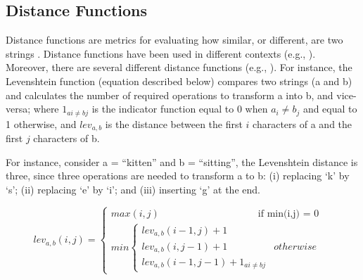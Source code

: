\subsection{Distance Functions}

Distance functions are metrics for evaluating how similar, or different, are two strings \cite{coutinho2016analysis}. Distance functions have been used in different contexts (e.g., \cite{runkler2000automatic,okuda1976method,lubis2018combination}). Moreover, there are several different distance functions (e.g., \cite{hamming1950error,han2007efficient:LCS,huang2008similaritycosine,de1mahalanobis:jaro,Levenshtein_SPD66}). For instance, the Levenshtein function \cite{Levenshtein_SPD66,kruskal1983overview} (equation described below) compares two strings (a and b) and calculates the number of required operations to transform a into b, and vice-versa; where $1_{ai \neq bj}$ is the indicator function equal to 0 when $a_{i} \neq b_{j}$ and equal to 1 otherwise, and $lev_{a,b}$ is the distance between the first $i$ characters of a and the first $j$ characters of b.

For instance, consider a = ``kitten'' and b = ``sitting'', the Levenshtein distance is three, since three operations are needed to transform a to b: (i) replacing `k' by `s'; (ii) replacing `e' by `i'; and (iii) inserting `g' at the end. 


\begin{equation*}
   lev_{a,b}(i,j) = 
    \begin{cases}
    max(i,j)  \qquad \qquad \qquad \qquad \qquad \text{if min(i,j) = 0}&\\
        min 
        \begin{cases}
            lev_{a,b}(i-1,j) + 1\\
            lev_{a,b}(i,j-1) + 1 & otherwise\\ 
            lev_{a,b}(i-1,j-1) + 1_{ai \neq bj} 
        \end{cases}
    \end{cases}
\end{equation*} 